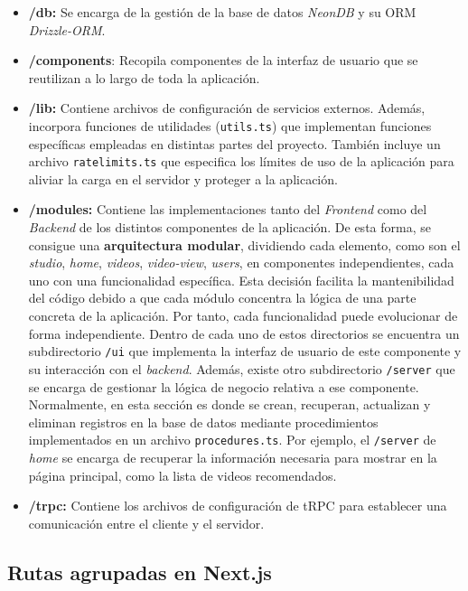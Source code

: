 \begin{itemize}
    \item \textbf{/db:} Se encarga de la gestión de la base de datos \textit{NeonDB} y su ORM \textit{Drizzle-ORM}.
    \item \textbf{/components}: Recopila componentes de la interfaz de usuario que se reutilizan a lo largo de toda la aplicación.
    \item \textbf{/lib:} Contiene archivos de configuración de servicios externos. Además, incorpora funciones de utilidades (\texttt{utils.ts}) que implementan funciones específicas empleadas en distintas partes del proyecto. También incluye un archivo \texttt{ratelimits.ts} que especifica los límites de uso de la aplicación para aliviar la carga en el servidor y proteger a la aplicación.
    \item \textbf{/modules:} Contiene las implementaciones tanto del \textit{Frontend} como del \textit{Backend} de los distintos componentes de la aplicación. De esta forma, se consigue una \textbf{ arquitectura modular}, dividiendo cada elemento, como son el \textit{studio}, \textit{home}, \textit{videos}, \textit{video-view}, \textit{users}, en componentes independientes, cada uno con una funcionalidad específica. Esta decisión facilita la mantenibilidad del código debido a que cada módulo concentra la lógica de una parte concreta de la aplicación. Por tanto, cada funcionalidad puede evolucionar de forma independiente. Dentro de cada uno de estos directorios se encuentra un subdirectorio \texttt{/ui} que implementa la interfaz de usuario de este componente y su interacción con el \textit{backend}. Además, existe otro subdirectorio \texttt{/server} que se encarga de gestionar la lógica de negocio relativa a ese componente. Normalmente, en esta sección es donde se crean, recuperan, actualizan y eliminan registros en la base de datos mediante procedimientos implementados en un archivo \texttt{procedures.ts}. Por ejemplo, el \texttt{/server} de \textit{home} se encarga de recuperar la información necesaria para mostrar en la página principal, como la lista de videos recomendados.
    \item \textbf{/trpc:} Contiene los archivos de configuración de tRPC para establecer una comunicación entre el cliente y el servidor. 
\end{itemize}

\subsection{Rutas agrupadas en Next.js}

